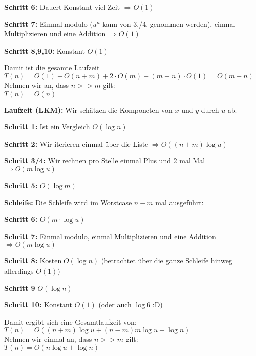 \documentclass[11pt,a4paper,ngerman]{article}
\begin{document}
\begin{enumerate}[\bfseries (a)]
\begin{description}
\begin{description}
\begin{description}
\item{\bfseries Schritt 6:} Dauert Konstant viel Zeit $\Rightarrow O(1)$
\item{\bfseries Schritt 7:} Einmal modulo ($u^n$ kann von 3./4. genommen werden), einmal Multiplizieren und eine Addition $\Rightarrow O(1)$
\item{\bfseries Schritt 8,9,10:} Konstant $O(1)$

\end{description}

\end{description}

Damit ist die gesamte Laufzeit \\$T(n) = O(1) + O(n + m) +2 \cdot  O(m) + (m-n) \cdot O(1) = O(m + n)$\\
Nehmen wir an, dass $n >> m$ gilt:\\
$T(n) = O(n)$

\item{\bfseries Laufzeit (LKM):}
Wir schätzen die Komponeten von $x$ und $y$  durch $u$ ab.
\begin{description}

\item{\bfseries Schritt 1:} Ist ein Vergleich $O(\log n)$
\item{\bfseries Schritt 2:} Wir iterieren einmal über die Liste $\Rightarrow O((n + m) \log u )$
\item{\bfseries Schritt 3/4:} Wir rechnen pro Stelle einmal Plus und 2 mal Mal $\Rightarrow O(m \log u)$
\item{\bfseries Schritt 5:} $O(\log m)$
\item{\bfseries Schleife:} Die Schleife wird im Worstcase $n-m$ mal ausgeführt:

\begin{description}

\item{\bfseries Schritt 6:} $O(m \cdot \log u)$
\item{\bfseries Schritt 7:} Einmal modulo, einmal Multiplizieren und eine Addition $\Rightarrow O(m \log u)$
\item{\bfseries Schritt 8:} Kosten $O(\log n)$ (betrachtet über die ganze Schleife hinweg allerdings $O(1)$)
\item{\bfseries Schritt 9} $O(\log n)$
\item{\bfseries Schritt 10:} Konstant $O(1)$ (oder auch $\log 6$ :D)

\end{description}

\end{description}

Damit ergibt sich eine Gesamtlaufzeit von:\\
$T(n) = O( (n+m) \log u + (n-m) m \log u + \log n)$\\
Nehmen wir einmal an, dass $n >> m$ gilt:\\
$T(n) = O(n \log u + \log n)$

\end{description}


\end{enumerate}
\label{LastPage}
\end{document}

